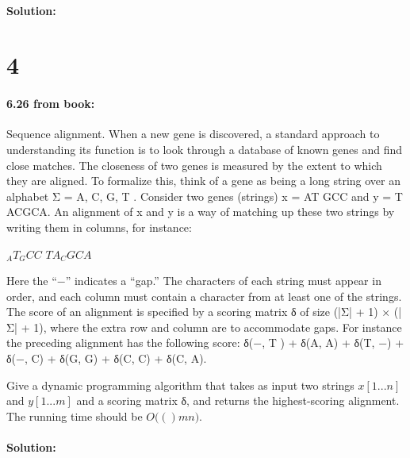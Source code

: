 \documentclass[12pt]{article}
\newcommand{\BigO}[1]{\ensuremath{O(#1)}}
\begin{document}
\paragraph{Solution:}

\section*{4}
\paragraph{6.26 from book:}
Sequence alignment. When a new gene is discovered, a standard approach to
understanding its function is to look through a database of known genes and
find close matches. The closeness of two genes is measured by the extent to 
which they are aligned. To formalize this, think of a gene as being a long
string over an alphabet Σ = {A, C, G, T }. Consider two genes (strings)
x = AT GCC and y = T ACGCA. An alignment of x and y is a way of matching up
these two strings by writing them in columns, for instance:

$_AT_GCC$
$TA_CGCA$

Here the “−” indicates a “gap.” The characters of each string must appear
in order, and each column must contain a character from at least one of 
the strings. The score of an alignment is specified by a scoring matrix δ
of size (|Σ| + 1) × (|Σ| + 1), where the extra row and column are to
accommodate gaps. For instance the preceding alignment has the following score:
δ(−, T ) + δ(A, A) + δ(T, −) + δ(−, C) + δ(G, G) + δ(C, C) + δ(C, A).

Give a dynamic programming algorithm that takes as input two strings $x[1 . . . n]$ and $y[1 . . . m]$ and a scoring matrix δ, and returns the highest-scoring alignment. The running time should be $\BigO(mn)$.

\paragraph{Solution:}
\end{document}
